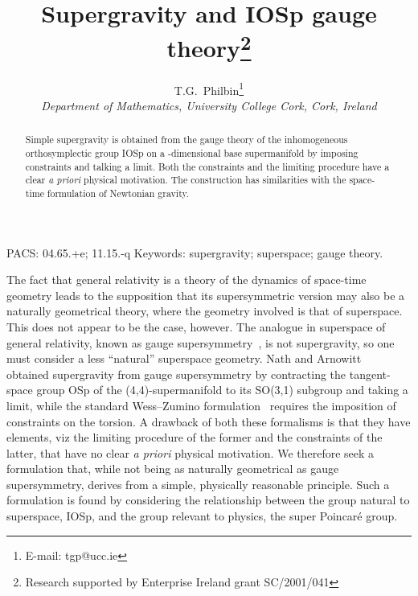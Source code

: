 \documentclass[a4paper,12pt]{article}
\begin{document}
\setlength{\abovedisplayskip}{10pt plus 3pt minus 9pt}
\setlength{\belowdisplayskip}{10pt plus 3pt minus 9pt}
\setlength{\abovedisplayshortskip}{0pt plus 3pt}
\setlength{\belowdisplayshortskip}{5pt plus 3pt minus 4pt}

\title{\bf Supergravity and IOSp\coordHE{} gauge theory\thanks{Research supported by Enterprise Ireland grant SC/2001/041}}

\author{T.G.\ Philbin\thanks{E-mail: tgp@ucc.ie} \\
 \small \it  Department of Mathematics, University College Cork, Cork, Ireland}  


\date{}

\maketitle

\begin{abstract}
Simple \coordHE{} supergravity is obtained from the gauge theory of the inhomogeneous orthosymplectic group IOSp\coordHE{} on a \coordHE{}-dimensional base supermanifold by imposing constraints and talking a limit. Both the constraints and the limiting procedure have a clear {\it a priori} physical motivation. The construction has similarities with the space-time formulation of Newtonian gravity.
\end{abstract}

\noindent
{\small  PACS:  04.65.+e; 11.15.-q  \newline
   Keywords: supergravity; superspace; gauge theory.}
\vspace{10mm}

The fact that general relativity is a theory of the dynamics of space-time geometry leads to the supposition that its supersymmetric version may also be a naturally geometrical theory, where the geometry involved is that of superspace. This does not appear to be the case, however. The analogue in superspace of general relativity, known as gauge supersymmetry~\cite{nat1}, is not supergravity, so one must consider a less ``natural'' superspace geometry. Nath and Arnowitt~\cite{nat2} obtained supergravity from gauge supersymmetry by contracting the tangent-space group OSp\coordHE{} of the (4,4)-supermanifold to its SO(3,1) subgroup and taking a limit, while the standard Wess--Zumino formulation~\cite{wes} requires the imposition of constraints on the torsion. A drawback of both these formalisms is that they have elements, viz the limiting procedure of the former and the constraints of the latter, that have no clear {\it a priori} physical motivation.  We therefore seek a formulation that, while not being as naturally geometrical as gauge supersymmetry, derives from a simple, physically reasonable principle. Such a formulation is found by considering the relationship between the group natural to superspace, IOSp\coordHE{}, and the group relevant to physics, the super Poincar\'{e} group.
\end{document}
